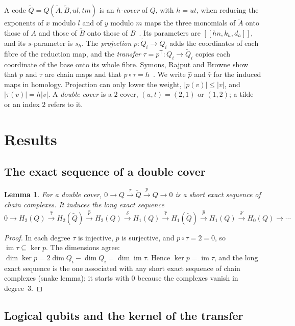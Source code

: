 \documentclass[11pt,a4paper]{article}
\newtheorem{lemma}[theorem]{Lemma}
\theoremstyle{definition}
\theoremstyle{plain}
\DeclareMathOperator{\im}{im}
\newcommand{\T}{\mathsf{T}}
\newcommand{\tQ}{\tilde Q}
\newcommand{\hp}{\hat p}
\newcommand{\htau}{\hat\tau}
\newcommand{\code}[1]{[\![#1]\!]}
\begin{document}
A code $\tQ=Q(\tilde A,\tilde B,ul,tm)$ is an \emph{$h$-cover} of $Q$, with
$h=ut$, when reducing the exponents of $x$ modulo $l$ and of $y$ modulo $m$
maps the three monomials of $\tilde A$ onto those of $A$ and those of
$\tilde B$ onto those of $B$~\cite{Symons2025}. Its parameters are
$\code{hn,k_h,d_h}$, and its $s$-parameter is $s_h$. The \emph{projection}
$p:\tQ_i\to Q_i$ adds the coordinates of each fibre of the reduction map, and
the \emph{transfer} $\tau=p^\T:Q_i\to\tQ_i$ copies each coordinate of the base
onto its whole fibre. Symons, Rajput and Browne show that $p$ and $\tau$ are
chain maps and that $p\circ\tau=h$~\cite{Symons2025}. We write $\hp$ and
$\htau$ for the induced maps in homology. Projection can only lower the
weight, $|p(v)|\le|v|$, and $|\tau(v)|=h|v|$. A \emph{double cover} is a
$2$-cover, $(u,t)=(2,1)$ or $(1,2)$; a tilde or an index $2$ refers to it.

\section{Results}\label{sec:results}
\subsection{The exact sequence of a double cover}

\begin{lemma}\label{lem:exact}
For a double cover, $0\to Q\xrightarrow{\ \tau\ }\tQ\xrightarrow{\ p\ }Q\to0$
is a short exact sequence of chain complexes. It induces the long exact
sequence
\[
0\to H_2(Q)\xrightarrow{\htau}H_2(\tQ)\xrightarrow{\hp}H_2(Q)
\xrightarrow{\delta}H_1(Q)\xrightarrow{\htau}H_1(\tQ)\xrightarrow{\hp}H_1(Q)
\xrightarrow{\delta'}H_0(Q)\to\cdots
\]
\end{lemma}

\begin{proof}
In each degree $\tau$ is injective, $p$ is surjective, and
$p\circ\tau=2=0$, so $\im\tau\subseteq\ker p$. The dimensions agree:
$\dim\ker p=2\dim Q_i-\dim Q_i=\dim\im\tau$. Hence $\ker p=\im\tau$, and the
long exact sequence is the one associated with any short exact sequence of
chain complexes (snake lemma); it starts with $0$ because the complexes vanish
in degree~$3$.
\end{proof}

\subsection{Logical qubits and the kernel of the transfer}
\end{document}

